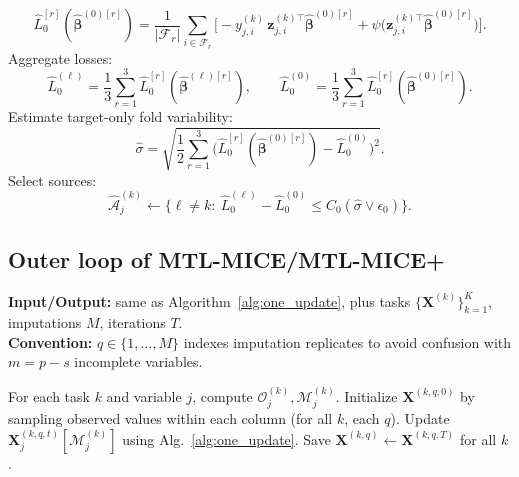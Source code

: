 \begin{algorithm}[H]
\begin{algorithmic}[1]
\[    \]
    \[
      \widehat{L}_0^{[r]}(\hat{\bm{\beta}}^{(0)[r]})
      =\frac{1}{|\mathcal{F}_r|}\sum_{i\in\mathcal{F}_r}
      \Big[-y^{(k)}_{j,i}\,\bm{z}^{(k)\top}_{j,i}\hat{\bm{\beta}}^{(0)[r]}+\psi\!\big(\bm{z}^{(k)\top}_{j,i}\hat{\bm{\beta}}^{(0)[r]}\big)\Big].
    \]
  \EndFor
\EndFor
\State Aggregate losses:
\[
\widehat{L}_0^{(\ell)}=\frac{1}{3}\sum_{r=1}^3 \widehat{L}_0^{[r]}(\hat{\bm{\beta}}^{(\ell)[r]}),\qquad
\widehat{L}_0^{(0)}=\frac{1}{3}\sum_{r=1}^3 \widehat{L}_0^{[r]}(\hat{\bm{\beta}}^{(0)[r]}).
\]
\State Estimate target-only fold variability:
\[
\hat{\sigma}=\sqrt{\frac{1}{2}\sum_{r=1}^3\Big(\widehat{L}_0^{[r]}(\hat{\bm{\beta}}^{(0)[r]})-\widehat{L}_0^{(0)}\Big)^2 }.
\]
\State Select sources:
\[
\widehat{\mathcal{A}}^{(k)}_j \leftarrow
\Big\{\ell\neq k:\ \widehat{L}_0^{(\ell)}-\widehat{L}_0^{(0)}\le C_0(\hat{\sigma}\vee \epsilon_0)\Big\}.
\]
\end{algorithmic}
\end{algorithm}


\subsection{Outer loop of MTL-MICE/MTL-MICE+}

\begin{algorithm}[H]
\footnotesize
\caption{MTL-MICE / MTL-MICE+ outer loop (calls Alg.~\ref{alg:one_update})}
\label{alg:mtlmice_outer}
\textbf{Input/Output:} same as Algorithm~\ref{alg:one_update}, plus tasks $\{\bm{X}^{(k)}\}_{k=1}^K$, imputations $M$, iterations $T$.\\
\textbf{Convention:} $q\in\{1,\dots,M\}$ indexes imputation replicates to avoid confusion with $m=p-s$ incomplete variables.
\begin{algorithmic}[1]
\State For each task $k$ and variable $j$, compute $\mathcal{O}^{(k)}_j,\mathcal{M}^{(k)}_j$.
\State Initialize $\bm{X}^{(k,q,0)}$ by sampling observed values within each column (for all $k$, each $q$).
        \State Update $\bm{X}^{(k,q,t)}_j[\mathcal{M}^{(k)}_j]$ using Alg.~\ref{alg:one_update}.
      \EndFor
    \EndFor
  \EndFor
  \State Save $\bm{X}^{(k,q)}\leftarrow \bm{X}^{(k,q,T)}$ for all $k$.
\EndFor
\end{algorithmic}
\end{algorithm}

